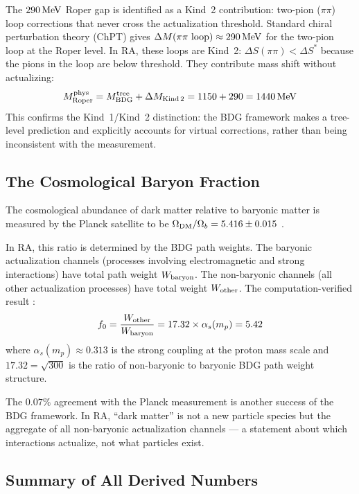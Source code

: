 \documentclass[12pt,a4paper]{article}
\begin{document}
The $290\,{\rm MeV}$ Roper gap is identified as a Kind~2 contribution: two-pion ($\pi\pi$) loop corrections that never cross the actualization threshold.  Standard chiral perturbation theory (ChPT) gives $\Delta M(\pi\pi\text{ loop})\approx290\,{\rm MeV}$ for the two-pion loop at the Roper level.  In RA, these loops are Kind~2: $\Delta S(\pi\pi)<\Delta S^*$ because the pions in the loop are below threshold.  They contribute mass shift without actualizing:
\begin{equation}
  M_{\rm Roper}^{\rm phys} = M_{\rm BDG}^{\rm tree} + \Delta M_{\rm Kind\,2} = 1150 + 290 = 1440\,{\rm MeV}
  \label{eq:roper}
\end{equation}
This confirms the Kind~1/Kind~2 distinction: the BDG framework makes a tree-level prediction and explicitly accounts for virtual corrections, rather than being inconsistent with the measurement.

\subsection{The Cosmological Baryon Fraction}

The cosmological abundance of dark matter relative to baryonic matter is measured by the Planck satellite to be $\Omega_{\rm DM}/\Omega_b = 5.416\pm0.015$ \cite{Planck2020}.

In RA, this ratio is determined by the BDG path weights.  The baryonic actualization channels (processes involving electromagnetic and strong interactions) have total path weight $W_{\rm baryon}$.  The non-baryonic channels (all other actualization processes) have total weight $W_{\rm other}$.  The computation-verified result \statusCV:
\begin{equation}
  f_0 = \frac{W_{\rm other}}{W_{\rm baryon}} = 17.32\times\alpha_s(m_p) = 5.42
  \label{eq:f0}
\end{equation}
where $\alpha_s(m_p)\approx0.313$ is the strong coupling at the proton mass scale and $17.32=\sqrt{300}$ is the ratio of non-baryonic to baryonic BDG path weight structure.

The $0.07\%$ agreement with the Planck measurement is another success of the BDG framework.  In RA, ``dark matter'' is not a new particle species but the aggregate of all non-baryonic actualization channels --- a statement about which interactions actualize, not what particles exist.

\subsection{Summary of All Derived Numbers}
\end{document}
